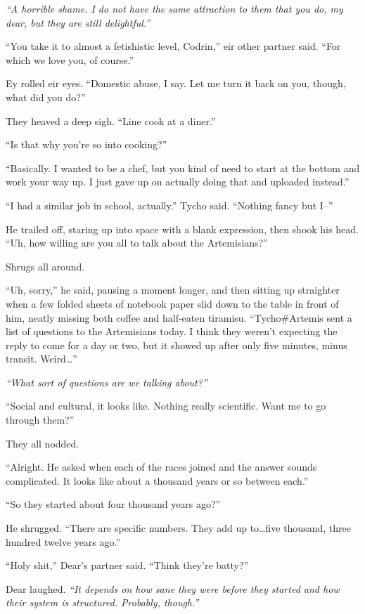 \emph{``A horrible shame. I do not have the same attraction to them that you do, my dear, but they are still delightful.''}

``You take it to almost a fetishistic level, Codrin,'' eir other partner said. ``For which we love you, of course.''

Ey rolled eir eyes. ``Domestic abuse, I say. Let me turn it back on you, though, what did you do?''

They heaved a deep sigh. ``Line cook at a diner.''

``Is that why you're so into cooking?''

``Basically. I wanted to be a chef, but you kind of need to start at the bottom and work your way up. I just gave up on actually doing that and uploaded instead.''

``I had a similar job in school, actually.'' Tycho said. ``Nothing fancy but I--''

He trailed off, staring up into space with a blank expression, then shook his head. ``Uh, how willing are you all to talk about the Artemisians?''

Shrugs all around.

``Uh, sorry,'' he said, pausing a moment longer, and then sitting up straighter when a few folded sheets of notebook paper slid down to the table in front of him, neatly missing both coffee and half-eaten tiramisu. ``Tycho\#Artemis sent a list of questions to the Artemisians today. I think they weren't expecting the reply to come for a day or two, but it showed up after only five minutes, minus transit. Weird\ldots{}''

\emph{``What sort of questions are we talking about?''}

``Social and cultural, it looks like. Nothing really scientific. Want me to go through them?''

They all nodded.

``Alright. He asked when each of the races joined and the answer sounds complicated. It looks like about a thousand years or so between each.''

``So they started about four thousand years ago?''

He shrugged. ``There are specific numbers. They add up to\ldots five thousand, three hundred twelve years ago.''

``Holy shit,'' Dear's partner said. ``Think they're batty?''

Dear laughed. \emph{``It depends on how sane they were before they started and how their system is structured. Probably, though.''}

